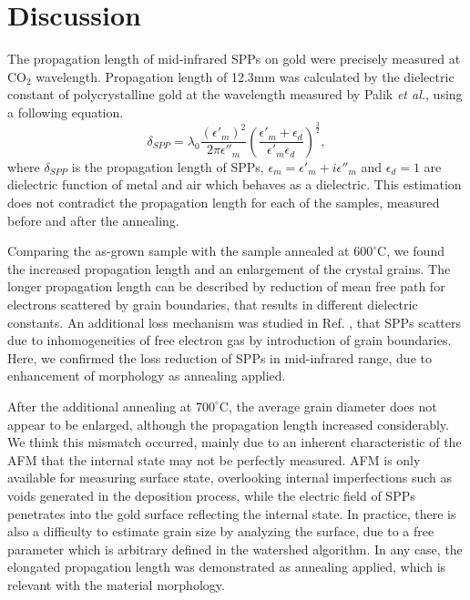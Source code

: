\documentclass[twocolumn,11pt,a4]{article}
\begin{document}
\section{Discussion}
\label{sec:discussion}
The propagation length of mid-infrared SPPs on gold were precisely measured at $\mathrm{CO_2}$ wavelength. Propagation length of 12.3mm was calculated by the dielectric constant of polycrystalline gold at the wavelength measured by Palik {\it et al.}\cite{Palik}, using a following equation\cite{William}.
\begin{equation}
 \delta_{SPP} = \lambda_0 \frac{(\epsilon'_m)^2}{2\pi\epsilon''_m} (\frac{\epsilon'_m+\epsilon_d}{\epsilon'_m \epsilon_d})^\frac{3}{2},
\label{eq:propagation_length}
 \end{equation}
where $\delta_{SPP}$ is the propagation length of SPPs, $\epsilon_m=\epsilon'_m+i\epsilon''_m$ and $\epsilon_d=1$ are dielectric function of metal and air which behaves as a dielectric. 
This estimation does not contradict the propagation length for each of the samples, measured before and after the annealing. 

Comparing the as-grown sample with the sample annealed at $600^\circ\mathrm{C}$, we found the increased propagation length and an enlargement of the crystal grains. 
The longer propagation length can be described by reduction of mean free path for electrons scattered by grain boundaries, that results in different dielectric constants.\cite{Jens}
An additional loss mechanism was studied in Ref. \cite{Kuttge}, that SPPs scatters due to inhomogeneities of free electron gas by introduction of grain boundaries. 
Here, we confirmed the loss reduction of SPPs in mid-infrared range, due to enhancement of morphology as annealing applied.

After the additional annealing at $700^\circ\mathrm{C}$, the average grain diameter does not appear to be enlarged, although the propagation length increased considerably. 
We think this mismatch occurred, mainly due to an inherent characteristic of the AFM that the internal state may not be perfectly measured.
AFM is only available for measuring surface state, overlooking internal imperfections such as voids generated in the deposition process, while the electric field of SPPs penetrates into the gold surface reflecting the internal state. 
In practice, there is also a difficulty to estimate grain size by analyzing the surface, due to a free parameter which is arbitrary defined in the watershed algorithm.
In any case, the elongated propagation length was demonstrated as annealing applied, which is relevant with the material morphology.
\end{document}
